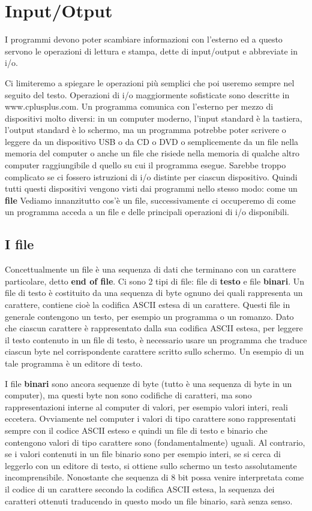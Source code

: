 \documentclass[a4paper,12pt]{book}
\begin{document}
\section{Input/Otput}
I programmi devono poter scambiare informazioni con l'esterno ed a questo servono le operazioni di lettura e stampa, dette di input/output e abbreviate in i/o.

\noindent Ci limiteremo a spiegare le operazioni più semplici che poi useremo sempre nel seguito del testo.
Operazioni di i/o maggiormente sofisticate sono descritte in www.cplusplus.com.
Un programma comunica con l'esterno per mezzo di dispositivi molto diversi: in un computer moderno, l'input standard è la tastiera, l'output standard è lo schermo, ma un programma potrebbe poter scrivere o leggere da un dispositivo USB o da CD o DVD o semplicemente da un file nella memoria del computer o anche un file che risiede nella memoria di qualche altro computer raggiungibile d quello su cui il programma esegue.
Sarebbe troppo complicato se ci fossero istruzioni di i/o distinte per ciascun dispositivo.
Quindi tutti questi dispositivi vengono visti dai programmi nello stesso modo: come un \textbf{file}
Vediamo innanzitutto cos'è un file, successivamente ci occuperemo di come un programma acceda a un file e delle principali operazioni di i/o disponibili.

\subsection{I file}
Concettualmente un file è una sequenza di dati che terminano con un carattere particolare, detto \textbf{end of file}. Ci sono 2 tipi di file: file di \textbf{testo} e file \textbf{binari}. Un file di testo è costituito da una sequenza di byte ognuno dei quali rappresenta un carattere, contiene cioè la codifica ASCII estesa di un carattere. Questi file in generale contengono un testo, per esempio un programma o un romanzo. Dato che ciascun carattere è rappresentato dalla sua codifica ASCII estesa, per leggere il testo contenuto in un file di testo, è necessario usare un programma che traduce ciascun byte nel corrispondente carattere scritto sullo schermo. Un esempio di un tale programma è un editore di testo. 

I file \textbf{binari} sono ancora sequenze di byte (tutto è una sequenza di byte in un computer), ma questi byte non sono codifiche di caratteri, ma sono rappresentazioni interne al computer di valori, per esempio valori interi, reali eccetera. Ovviamente nel computer i valori di tipo carattere sono rappresentati sempre con il codice ASCII esteso e quindi un file di testo e binario che contengono valori di tipo carattere sono (fondamentalmente) uguali. Al contrario, se i valori contenuti in un file binario sono per esempio interi, se si cerca di leggerlo con un editore di testo, si ottiene sullo schermo un testo assolutamente incomprensibile. Nonostante che sequenza di 8 bit possa venire interpretata come il codice di un carattere secondo la codifica ASCII estesa, la sequenza dei caratteri ottenuti traducendo in questo modo un file binario, sarà senza senso. 
\end{document}
